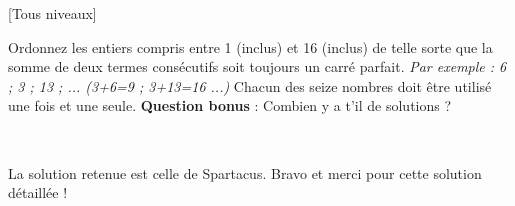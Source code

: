 
%
[Tous niveaux]

\begin{center}
\end{center}

Ordonnez les entiers compris entre 1 (inclus) et 16 (inclus) de telle sorte que la somme de deux termes consécutifs soit toujours un carré parfait.
\textit{Par exemple : 6 ; 3 ; 13 ; ... (3+6=9 ; 3+13=16 ...)}
Chacun des seize nombres doit être utilisé une fois et une seule.
\textbf{Question bonus} : Combien y a t'il de solutions ?
\par
~
\begin{solution}
     La solution retenue est celle de Spartacus. Bravo et merci pour cette solution détaillée !
     \par
     [pdf-embedder url="/wp-content/uploads/slides/enigme-10-16/solution.pdf" width="676"]
\end{solution}
